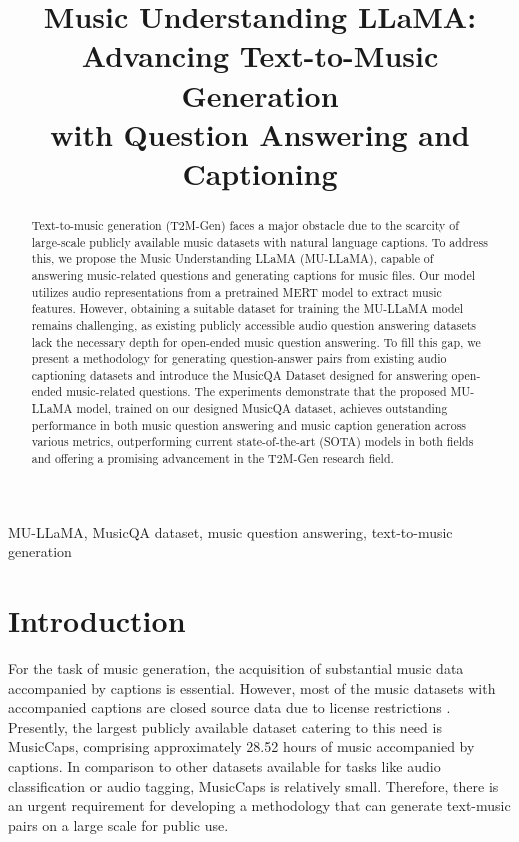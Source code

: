 \documentclass{article}
\title{Music Understanding LLaMA:\\Advancing Text-to-Music Generation\\with Question Answering and Captioning}
\begin{document}
\maketitle
\begin{abstract}
Text-to-music generation (T2M-Gen) faces a major obstacle due to the scarcity of large-scale publicly available music datasets with natural language captions. To address this, we propose the Music Understanding LLaMA (MU-LLaMA), capable of answering music-related questions and generating captions for music files. Our model utilizes audio representations from a pretrained MERT model to extract music features. However, obtaining a suitable dataset for training the MU-LLaMA model remains challenging, as existing publicly accessible audio question answering datasets lack the necessary depth for open-ended music question answering. To fill this gap, we present a methodology for generating question-answer pairs from existing audio captioning datasets and introduce the MusicQA Dataset designed for answering open-ended music-related questions. The experiments demonstrate that the proposed MU-LLaMA model, trained on our designed MusicQA dataset, achieves outstanding performance in both music question answering and music caption generation across various metrics, outperforming current state-of-the-art (SOTA) models in both fields and offering a promising advancement in the T2M-Gen research field.
\end{abstract}
\begin{keywords}
MU-LLaMA, MusicQA dataset, music question answering, text-to-music generation
\end{keywords}
\vspace{-0.2cm}

\section{Introduction}
\label{sec:intro}
\vspace{-0.2cm}

\noindent
For the task of music generation, the acquisition of substantial music data accompanied by captions is essential. However, most of the music datasets with accompanied captions are closed source data due to license restrictions \cite{copet2023simple, dhariwal2020jukebox, schneider2023mousai}. Presently, the largest publicly available dataset catering to this need is MusicCaps\cite{agostinelli2023musiclm}, comprising approximately 28.52 hours of music accompanied by captions. In comparison to other datasets available for tasks like audio classification or audio tagging, MusicCaps is relatively small. Therefore, there is an urgent requirement for developing a methodology that can generate text-music pairs on a large scale for public use.
\end{document}
